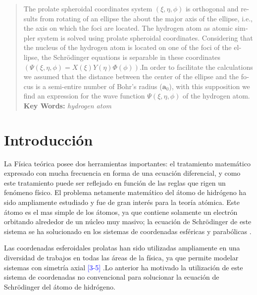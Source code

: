 \documentclass[12pt]{article}
\begin{document}
    \begin{otherlanguage}{english}
        \begin{abstract}
            The prolate spheroidal coordinates system $(\xi ,\eta,\phi)$ is orthogonal and results 
            from rotating of an ellipse the about the major axis of the ellipse, i.e., the axis 
            on which the foci are located. The hydrogen atom as atomic simpler system is 
            solved using prolate spheroidal coordinates. Considering that the nucleus of 
            the hydrogen atom is located on one of the foci of the ellipse, the Schrödinger 
            equations is separable in these coordinates $\left(\Psi(\xi,\eta,\phi) = X(\xi)Y(\eta)\Phi(\phi)\right)$.In 
            order to facilitate the calculations we assumed that the distance between the 
            center of the ellipse and the focus is a semi-entire number of Bohr’s radius ($\textbf{a}_{0}$), 
            with this supposition we find an expression for the wave function $\Psi(\xi,\eta,\phi)$ of the hydrogen atom.\\
            \textbf{Key Words:} \hspace{1mm} \textit{hydrogen atom}
        \end{abstract}
    \end{otherlanguage}

    \newpage
        \section{Introducción}
        {\Huge L}a Física teórica posee dos herramientas 
        importantes: el tratamiento matemático 
        expresado con mucha frecuencia en 
        forma de una ecuación diferencial, y como este 
        tratamiento puede ser reflejado en función de 
        las reglas que rigen un fenómeno físico. El 
        problema netamente matemático del átomo 
        de hidrógeno ha sido ampliamente estudiado 
        y fue de gran interés para la teoría atómica. 
        Este átomo es el mas simple de los átomos, ya 
        que contiene solamente un electrón orbitando 
        alrededor de un núcleo muy masivo; la 
        ecuación de Schrödinger de este sistema se ha 
        solucionado en los sistemas de coordenadas 
        esféricas y parabólicas \textcolor{blue}{\cite{Schiff,Landau}}.

        Las coordenadas esferoidales prolatas han 
        sido utilizadas ampliamente en una diversidad 
        de trabajos en todas las áreas de la física, ya 
        que permite modelar sistemas con simetría 
        axial \textcolor{blue}{[3-5]} %
        .Lo anterior ha motivado la 
        utilización de este sistema de coordenadas no 
        convencional para solucionar la ecuación de 
        Schr\"odinger del átomo de hidrógeno.
\end{document}
